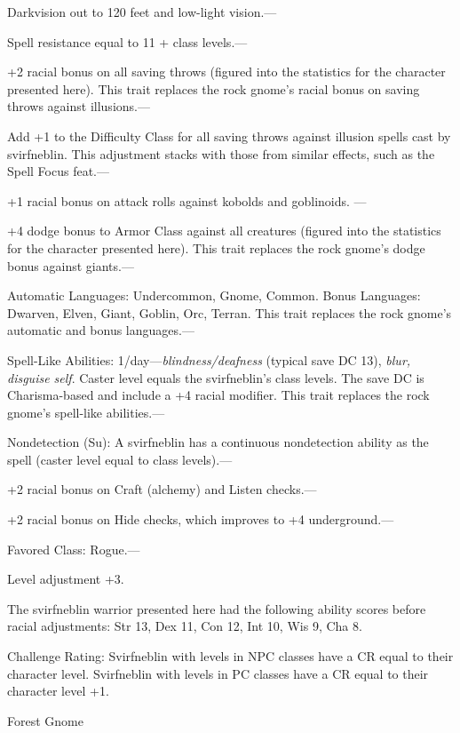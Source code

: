 \documentclass{article}
\begin{document}
Darkvision out to 120 feet and low-light vision.---

Spell resistance equal to 11 + class levels.--- 

\parindent=3pt
+2 racial bonus on all saving throws (figured into the statistics for the character 
presented here). This trait replaces the rock gnome's racial bonus on saving throws 
against illusions.---

\parindent=0pt
Add +1 to the Difficulty Class for all saving throws against illusion spells cast 
by svirfneblin. This adjustment stacks with those from similar effects, such as 
the Spell Focus feat.--- 

\parindent=3pt
+1 racial bonus on attack rolls against kobolds and goblinoids. --- 

+4 dodge bonus to Armor Class against all creatures (figured into the statistics 
for the character presented here). This trait replaces the rock gnome's dodge bonus 
against giants.---

Automatic Languages: Undercommon, Gnome, Common. Bonus Languages: Dwarven, Elven, 
Giant, Goblin, Orc, Terran. This trait replaces the rock gnome's automatic and 
bonus languages.---

Spell-Like Abilities: 1/day---\textit{blindness/deafness }(typical save DC 13), 
\textit{blur, disguise self}. Caster level equals the svirfneblin's class levels. 
The save DC is Charisma-based and include a +4 racial modifier. This trait replaces 
the rock gnome's spell-like abilities.---

\parindent=0pt
Nondetection (Su): A svirfneblin has a continuous nondetection ability as the spell 
(caster level equal to class levels).--- 

\parindent=3pt
+2 racial bonus on Craft (alchemy) and Listen checks.--- 

+2 racial bonus on Hide checks, which improves to +4 underground.---

Favored Class: Rogue.---

Level adjustment +3.

The svirfneblin warrior presented here had the following ability scores before 
racial adjustments: Str 13, Dex 11, Con 12, Int 10, Wis 9, Cha 8.

Challenge Rating: Svirfneblin with levels in NPC classes have a CR equal to their 
character level. Svirfneblin with levels in PC classes have a CR equal to their 
character level +1.

\parindent=0pt
Forest Gnome
\end{document}
